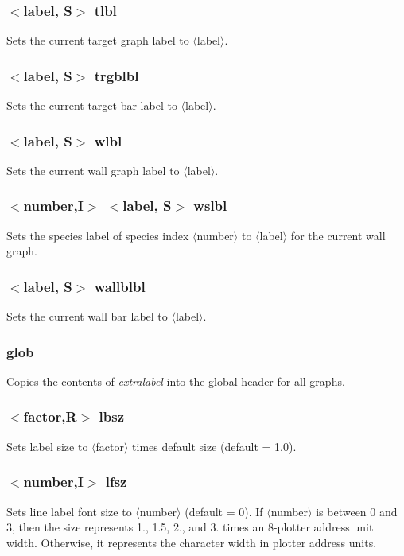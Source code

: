 \documentclass[a4paper,10pt]{report}
\begin{document}
\subsubsection{$<$label, {\bf S}$>$ tlbl}\label{sec:tlbl}
Sets the current target graph label to $\langle$label$\rangle$.

\subsubsection{$<$label, {\bf S}$>$ trgblbl}\label{sec:trgblbl}
Sets the current target bar label to $\langle$label$\rangle$.

\subsubsection{$<$label, {\bf S}$>$ wlbl}\label{sec:wlbl}
Sets the current wall graph label to $\langle$label$\rangle$.

\subsubsection{$<$number,{\bf I}$>$ $<$label, {\bf S}$>$ wslbl}\label{sec:wslbl}
Sets the species label of species index $\langle$number$\rangle$ to $\langle$label$\rangle$ for the current wall graph.

\subsubsection{$<$label, {\bf S}$>$ wallblbl}\label{sec:wallblbl}
Sets the current wall bar label to $\langle$label$\rangle$.

\subsubsection{glob}\label{sec:glob}
Copies the contents of {\em extralabel} into the global header for all graphs.

\subsubsection{$<$factor,{\bf R}$>$ lbsz}\label{sec:lbsz}
Sets label size to $\langle$factor$\rangle$ times default size (default = 1.0).

\subsubsection{$<$number,{\bf I}$>$ lfsz}\label{sec:lfsz}
Sets line label font size to $\langle$number$\rangle$ (default = 0). If $\langle$number$\rangle$ is between 0 and 3, then the size
represents 1., 1.5, 2., and 3. times an 8-plotter address unit width. Otherwise, it represents the character
width in plotter address units.
\end{document}
